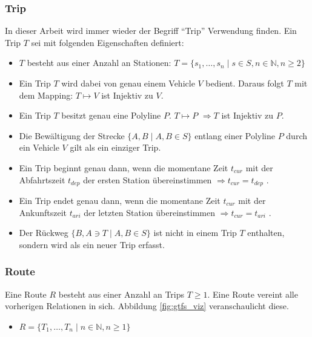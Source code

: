 \begin{newpage}
    \subsubsection{Trip}
    \label{ssub:trip}
      In dieser Arbeit wird immer wieder der Begriff "`Trip"' Verwendung finden. Ein Trip $T$ sei mit folgenden Eigenschaften definiert:
      \begin{itemize}
        \item $T$ besteht aus einer Anzahl an Stationen: $T = \{s_1, \dotsc, s_n \;|\; s \in S, n \in \mathbb{N}, n \geq 2 \}$

        \item Ein Trip $T$ wird dabei von genau einem Vehicle $V$ bedient. Daraus folgt $T$ mit dem Mapping: $T \mapsto V$ ist Injektiv zu $V$. 

        \item Ein Trip $T$ besitzt genau eine Polyline $P$. $T \mapsto P$ $ \Rightarrow T$ ist Injektiv zu $P$. 

        \item Die Bewältigung der Strecke $\{A,B \;|\; A, B \in S\}$ entlang einer Polyline $P$ durch ein Vehicle $V$ gilt als ein einziger Trip.

        \item Ein Trip beginnt genau dann, wenn die momentane Zeit $t_{cur}$ mit der Abfahrtszeit $t_{dep}$ der ersten Station übereinstimmen $\Rightarrow t_{cur} = t_{dep} $ .

        \item Ein Trip endet genau dann, wenn die momentane Zeit $t_{cur}$ mit der Ankunftszeit $t_{ari}$ der letzten Station übereinstimmen $\Rightarrow t_{cur} = t_{ari} $ .

        \item Der Rückweg $\{B, A \ni T \;|\; A, B \in S\}$ ist nicht in einem Trip $T$ enthalten, sondern wird als ein neuer Trip erfasst.
      \end{itemize}
      

      \subsubsection{Route}
      \label{ssub:route}
        Eine Route $R$ besteht aus einer Anzahl an Trips $T \geq 1$. Eine Route vereint alle vorherigen Relationen in sich. Abbildung \ref{fig:gtfs_viz} veranschaulicht diese. 

        \begin{itemize}
          \item $R = \{ T_1, \dotsc, T_n \;|\; n \in \mathbb{N}, n \geq 1 \}$


\end{itemize}
\end{newpage}
